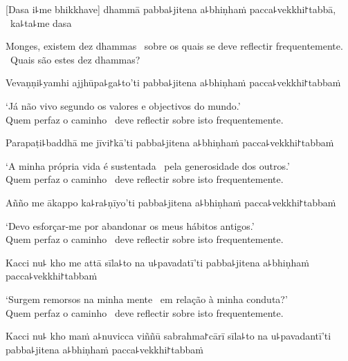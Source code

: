 
\begin{leader}
\end{leader}

[Dasa i꜕me bhikkhave] dhammā pabba꜕jitena a꜕bhiṇhaṁ pacca꜕vekkhi꜓tabbā, \pause\ ka꜕ta꜕me dasa

\begin{english}
  Monges, existem dez dhammas \pause\ sobre os quais se deve reflectir frequentemente. \pause\ Quais são estes dez dhammas?
\end{english}

Vevaṇṇi꜕yamhi ajjhūpa꜕ga꜕to'ti pabba꜕jitena a꜕bhiṇhaṁ pacca꜕vekkhi꜓tabbaṁ

\begin{english}
  `Já não vivo segundo os valores e objectivos do mundo.' \pause\\
  Quem perfaz o caminho \pause\ deve reflectir sobre isto frequentemente.
\end{english}

Parapaṭi꜕baddhā me jīvi꜓kā'ti pabba꜕jitena a꜕bhiṇhaṁ pacca꜕vekkhi꜓tabbaṁ

\begin{english}
  `A minha própria vida é sustentada \pause\ pela generosidade dos outros.' \pause\\
  Quem perfaz o caminho \pause\ deve reflectir sobre isto frequentemente.
\end{english}

Añño me ākappo ka꜕ra꜕ṇīyo'ti pabba꜕jitena a꜕bhiṇhaṁ pacca꜕vekkhi꜓tabbaṁ

\begin{english}
  `Devo esforçar-me por abandonar os meus hábitos antigos.' \pause\\
  Quem perfaz o caminho \pause\ deve reflectir sobre isto frequentemente.
\end{english}

\clearpage

Kacci nu꜕ kho me attā sīla꜕to na u꜕pavadatī'ti pabba꜕jitena a꜕bhiṇhaṁ pacca꜕vekkhi꜓tabbaṁ

\begin{english}
  `Surgem remorsos na minha mente \pause\ em relação à minha conduta?' \pause\\
  Quem perfaz o caminho \pause\ deve reflectir sobre isto frequentemente.
\end{english}

Kacci nu꜕ kho maṁ a꜕nuvicca viññū sabrahma꜓cārī sīla꜕to na u꜕pavadantī'ti pabba꜕jitena a꜕bhiṇhaṁ pacca꜕vekkhi꜓tabbaṁ

